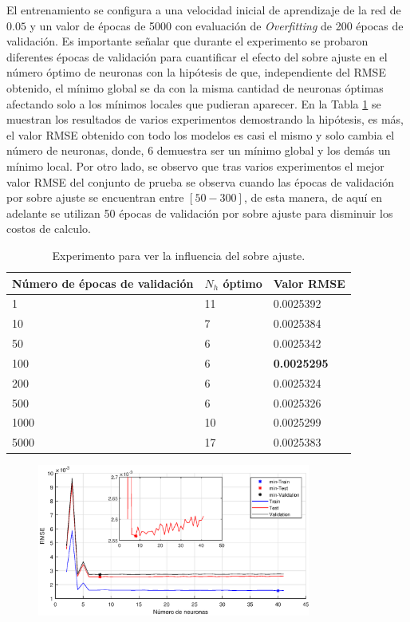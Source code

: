 \documentclass[12pt]{article}
\begin{document}
\begin{itemize}
	El entrenamiento se configura a una velocidad inicial de aprendizaje de la red de $0.05$ y un valor de épocas de 5000 con evaluación de \textit{Overfitting} de 200 épocas de validación. Es importante señalar que durante el experimento se probaron diferentes épocas de validación para cuantificar el efecto del sobre ajuste en el número óptimo de neuronas con la hipótesis de que, independiente del RMSE obtenido, el mínimo global se da con la misma cantidad de neuronas óptimas afectando solo a los mínimos locales que pudieran aparecer. En la Tabla \ref{sobreajuste} se muestran los resultados de varios experimentos demostrando la hipótesis, es más, el valor RMSE obtenido con todo los modelos es casi el mismo y solo cambia el número de neuronas, donde, $6$ demuestra ser un mínimo global y los demás un mínimo local. Por otro lado, se observo que tras varios experimentos el mejor valor RMSE del conjunto de prueba se observa cuando las épocas de validación por sobre ajuste se encuentran entre $[50-300]$, de esta manera, de aquí en adelante se utilizan 50 épocas de validación por sobre ajuste para disminuir los costos de calculo.
	\begin{table}[h!]
		\centering
		\caption{Experimento para ver la influencia del sobre ajuste.}
		\begin{tabular}{|l|l|l|}
			\hline
			Número de épocas de validación & $N_h$ óptimo & Valor RMSE \\ \hline
			1                              & 11           & 0.0025392   \\ \hline
			10                             & 7            & 0.0025384  \\ \hline
			50                             & 6            & 0.0025342  \\ \hline
			100                            & 6            & \textbf{0.0025295}  \\ \hline
			200                            & 6            & 0.0025324  \\ \hline
			500                            & 6            & 0.0025326  \\ \hline
			1000                            & 10           & 0.0025299  \\ \hline
			5000                            & 17            & 0.0025383  \\ \hline
		\end{tabular}
	\label{sobreajuste}
	\end{table}
	\newpage
	\begin{figure}[t!]
		\centering
		\includegraphics[width=0.8\textwidth]{imag/redes/RMSE_full.eps}

\end{figure}
\end{itemize}
\end{document}
